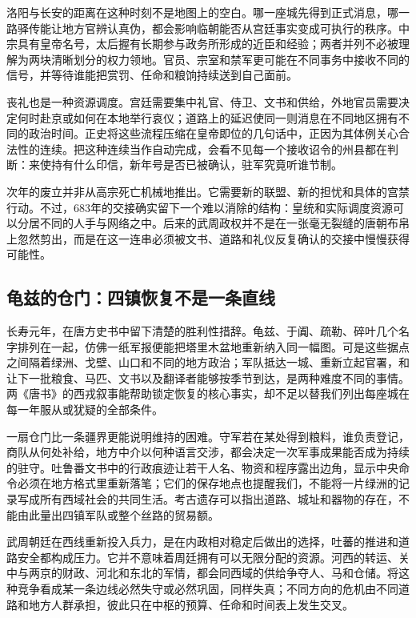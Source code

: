 洛阳与长安的距离在这种时刻不是地图上的空白。哪一座城先得到正式消息，哪一路驿传能让地方官辨认真伪，都会影响临朝能否从宫廷事实变成可执行的秩序。中宗具有皇帝名号，太后握有长期参与政务所形成的近臣和经验；两者并列不必被理解为两块清晰划分的权力领地。官员、宗室和禁军更可能在不同事务中接收不同的信号，并等待谁能把赏罚、任命和粮饷持续送到自己面前。

丧礼也是一种资源调度。宫廷需要集中礼官、侍卫、文书和供给，外地官员需要决定何时赴京或如何在本地举行哀仪；道路上的延迟使同一则消息在不同地区拥有不同的政治时间。正史将这些流程压缩在皇帝即位的几句话中，正因为其体例关心合法性的连续。把这种连续当作自动完成，会看不见每一个接收诏令的州县都在判断：来使持有什么印信，新年号是否已被确认，驻军究竟听谁节制。

次年的废立并非从高宗死亡机械地推出。它需要新的联盟、新的担忧和具体的宫禁行动。不过，683年的交接确实留下一个难以消除的结构：皇统和实际调度资源可以分居不同的人手与网络之中。后来的武周政权并不是在一张毫无裂缝的唐朝布帛上忽然剪出，而是在这一连串必须被文书、道路和礼仪反复确认的交接中慢慢获得可能性。

\subsection{龟兹的仓门：四镇恢复不是一条直线}
长寿元年，在唐方史书中留下清楚的胜利性措辞。龟兹、于阗、疏勒、碎叶几个名字排列在一起，仿佛一纸军报便能把塔里木盆地重新纳入同一幅图。可是这些据点之间隔着绿洲、戈壁、山口和不同的地方政治；军队抵达一城、重新立起官署，和让下一批粮食、马匹、文书以及翻译者能够按季节到达，是两种难度不同的事情。两《唐书》的西戎叙事能帮助锁定恢复的核心事实，却不足以替我们列出每座城在每一年服从或犹疑的全部条件。

一扇仓门比一条疆界更能说明维持的困难。守军若在某处得到粮料，谁负责登记，商队从何处补给，地方中介以何种语言交涉，都会决定一次军事成果能否成为持续的驻守。吐鲁番文书中的行政痕迹让若干人名、物资和程序露出边角，显示中央命令必须在地方格式里重新落笔；它们的保存地点也提醒我们，不能将一片绿洲的记录写成所有西域社会的共同生活。考古遗存可以指出道路、城址和器物的存在，不能由此量出四镇军队或整个丝路的贸易额。

武周朝廷在西线重新投入兵力，是在内政相对稳定后做出的选择，吐蕃的推进和道路安全都构成压力。它并不意味着周廷拥有可以无限分配的资源。河西的转运、关中与两京的财政、河北和东北的军情，都会同西域的供给争夺人、马和仓储。将这种竞争看成某一条边线必然失守或必然巩固，同样失真；不同方向的危机由不同道路和地方人群承担，彼此只在中枢的预算、任命和时间表上发生交叉。

